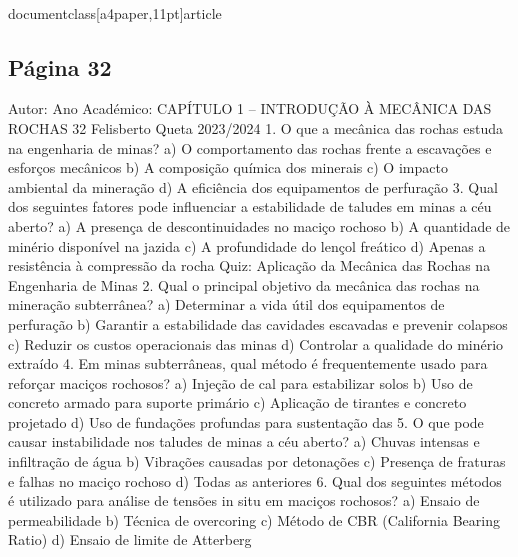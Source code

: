 \\documentclass[a4paper,11pt]{article}
\begin{document}
\subsection*{Página 32}
Autor:
Ano Académico:
CAPÍTULO 1 – INTRODUÇÃO À MECÂNICA DAS ROCHAS
32
Felisberto Queta
2023/2024
1. O que a mecânica das rochas estuda na engenharia de minas?
a) O comportamento das rochas frente a escavações e esforços mecânicos
b) A composição química dos minerais
c) O impacto ambiental da mineração
d) A eficiência dos equipamentos de perfuração
3. Qual dos seguintes fatores pode influenciar a estabilidade de taludes em minas a céu aberto?
a) A presença de descontinuidades no maciço rochoso
b) A quantidade de minério disponível na jazida
c) A profundidade do lençol freático
d) Apenas a resistência à compressão da rocha
Quiz: Aplicação da 
Mecânica das 
Rochas na 
Engenharia de 
Minas
2. Qual o principal objetivo da mecânica das rochas na mineração subterrânea?
a) Determinar a vida útil dos equipamentos de perfuração
b) Garantir a estabilidade das cavidades escavadas e prevenir colapsos
c) Reduzir os custos operacionais das minas
d) Controlar a qualidade do minério extraído
4. Em minas subterrâneas, qual método é frequentemente usado para reforçar maciços rochosos?
a) Injeção de cal para estabilizar solos
b) Uso de concreto armado para suporte primário
c) Aplicação de tirantes e concreto projetado
d) Uso de fundações profundas para sustentação das
5. O que pode causar instabilidade nos taludes de minas a céu aberto?
a) Chuvas intensas e infiltração de água
b) Vibrações causadas por detonações
c) Presença de fraturas e falhas no maciço rochoso
d) Todas as anteriores
6. Qual dos seguintes métodos é utilizado para análise de tensões in situ em maciços rochosos?
a) Ensaio de permeabilidade
b) Técnica de overcoring
c) Método de CBR (California Bearing Ratio)
d) Ensaio de limite de Atterberg
\end{document}
